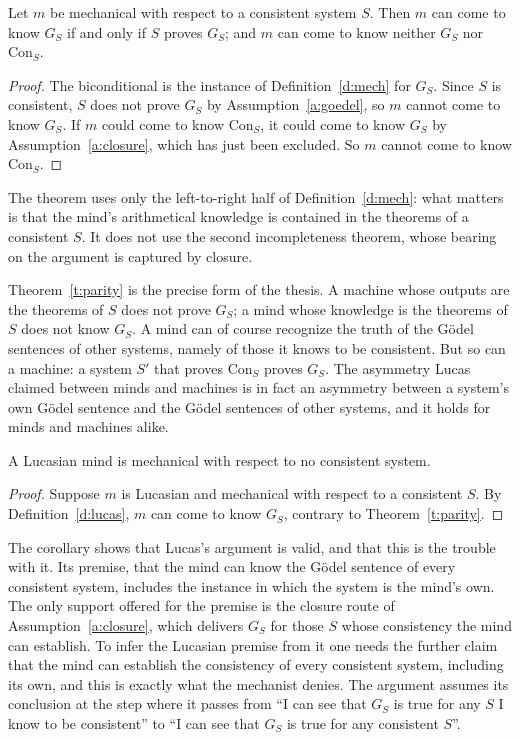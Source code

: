 \documentclass{situationist-preprint}
\begin{document}
\begin{theorem}[Parity]\label{t:parity}
Let $m$ be mechanical with respect to a consistent system $S$. Then $m$ can come to know $G_S$ if and only if $S$ proves $G_S$; and $m$ can come to know neither $G_S$ nor $\mathrm{Con}_S$.
\end{theorem}

\begin{proof}
The biconditional is the instance of Definition~\ref{d:mech} for $G_S$. Since $S$ is consistent, $S$ does not prove $G_S$ by Assumption~\ref{a:goedel}, so $m$ cannot come to know $G_S$. If $m$ could come to know $\mathrm{Con}_S$, it could come to know $G_S$ by Assumption~\ref{a:closure}, which has just been excluded. So $m$ cannot come to know $\mathrm{Con}_S$.
\end{proof}

The theorem uses only the left-to-right half of Definition~\ref{d:mech}: what matters is that the mind's arithmetical knowledge is contained in the theorems of a consistent $S$. It does not use the second incompleteness theorem, whose bearing on the argument is captured by closure.

Theorem~\ref{t:parity} is the precise form of the thesis. A machine whose outputs are the theorems of $S$ does not prove $G_S$; a mind whose knowledge is the theorems of $S$ does not know $G_S$. A mind can of course recognize the truth of the G\"odel sentences of other systems, namely of those it knows to be consistent. But so can a machine: a system $S'$ that proves $\mathrm{Con}_S$ proves $G_S$. The asymmetry Lucas claimed between minds and machines is in fact an asymmetry between a system's own G\"odel sentence and the G\"odel sentences of other systems, and it holds for minds and machines alike.

\begin{corollary}\label{c:lucas}
A Lucasian mind is mechanical with respect to no consistent system.
\end{corollary}

\begin{proof}
Suppose $m$ is Lucasian and mechanical with respect to a consistent $S$. By Definition~\ref{d:lucas}, $m$ can come to know $G_S$, contrary to Theorem~\ref{t:parity}.
\end{proof}

The corollary shows that Lucas's argument is valid, and that this is the trouble with it. Its premise, that the mind can know the G\"odel sentence of every consistent system, includes the instance in which the system is the mind's own. The only support offered for the premise is the closure route of Assumption~\ref{a:closure}, which delivers $G_S$ for those $S$ whose consistency the mind can establish. To infer the Lucasian premise from it one needs the further claim that the mind can establish the consistency of every consistent system, including its own, and this is exactly what the mechanist denies. The argument assumes its conclusion at the step where it passes from ``I can see that $G_S$ is true for any $S$ I know to be consistent'' to ``I can see that $G_S$ is true for any consistent $S$''.
\end{document}
